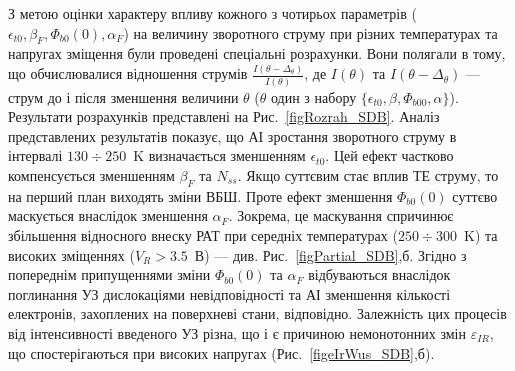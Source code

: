 З метою оцінки характеру впливу  кожного з чотирьох параметрів ($\epsilon_{t0}, \beta_F, \Phi_{b0}(0), \alpha_F$) на величину зворотного струму при
різних температурах та напругах зміщення були проведені спеціальні розрахунки.
Вони полягали в тому, що обчислювалися відношення струмів
$\frac{I(\theta-\Delta_\theta)}{I(\theta)}$,
де $I(\theta)$ та $I(\theta-\Delta_\theta)$ --- струм до і після зменшення величини $\theta$ ($\theta$ один з набору $\{\epsilon_{t0}, \beta, \Phi_{b00}, \alpha\}$).
Результати розрахунків представлені на Рис.~\ref{figRozrah_SDB}.
Аналіз представлених результатів показує, що АІ зростання зворотного струму в інтервалі $130\div250$~K визначається зменшенням $\epsilon_{t0}$.
Цей ефект частково компенсується зменшенням $\beta_F$ та $N_{ss}$.
Якщо суттєвим стає вплив ТЕ струму, то на перший план виходять зміни ВБШ.
Проте ефект зменшення $\Phi_{b0}(0)$ суттєво маскується внаслідок зменшення $\alpha_F$.
Зокрема, це маскування спричинює збільшення відносного внеску РАТ при середніх температурах ($250\div300$~K) та високих зміщеннях ($V_R>3.5$~В) --- див. Рис.~\ref{figPartial_SDB},б.
Згідно з попереднім  припущеннями зміни $\Phi_{b0}(0)$ та $\alpha_F$ відбуваються внаслідок поглинання УЗ дислокаціями
невідповідності та АІ зменшення кількості електронів, захоплених на поверхневі стани, відповідно.
Залежність цих процесів від інтенсивності введеного УЗ різна,
що і є причиною немонотонних змін $\varepsilon_{IR}$, що спостерігаються при високих напругах (Рис.~\ref{figeIrWus_SDB},б).



